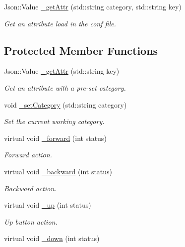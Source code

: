 \begin{DoxyCompactItemize}
\item 
Json\+::\+Value \hyperlink{class_characters_ace37d9664457f555a0009eb5f3b8b6b2}{\+\_\+get\+Attr} (std\+::string category, std\+::string key)
\begin{DoxyCompactList}\small\item\em Get an attribute load in the conf file. \end{DoxyCompactList}\end{DoxyCompactItemize}
\subsection*{Protected Member Functions}
\begin{DoxyCompactItemize}
\item 
Json\+::\+Value \hyperlink{class_characters_abd51b12301a105d11021ac3302c742ea}{\+\_\+get\+Attr} (std\+::string key)
\begin{DoxyCompactList}\small\item\em Get an attribute with a pre-\/set category. \end{DoxyCompactList}\item 
void \hyperlink{class_characters_a9a06365f3881336e2ee8509129ec54cd}{\+\_\+set\+Category} (std\+::string category)
\begin{DoxyCompactList}\small\item\em Set the current working category. \end{DoxyCompactList}\item 
virtual void \hyperlink{class_characters_af8dca1980a447965ffeb2ea17a507c5c}{\+\_\+forward} (int status)
\begin{DoxyCompactList}\small\item\em Forward action. \end{DoxyCompactList}\item 
virtual void \hyperlink{class_characters_ab5b3e9e9140665e9e358343d9b47ea1c}{\+\_\+backward} (int status)
\begin{DoxyCompactList}\small\item\em Backward action. \end{DoxyCompactList}\item 
virtual void \hyperlink{class_characters_a2bb63a2db8990e516cc2424f1dbf713a}{\+\_\+up} (int status)
\begin{DoxyCompactList}\small\item\em Up button action. \end{DoxyCompactList}\item 
virtual void \hyperlink{class_characters_a3253373f4bf97f623de6d758b464b553}{\+\_\+down} (int status)

\end{DoxyCompactItemize}
